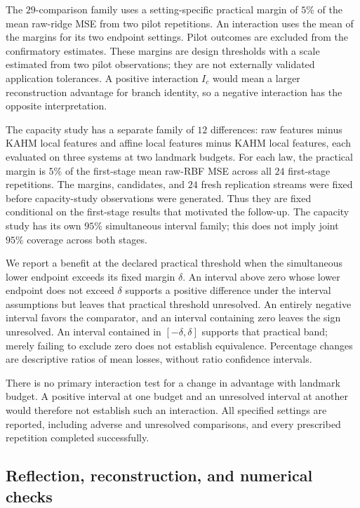 The $29$-comparison family uses a setting-specific practical margin
of $5\%$ of the mean raw-ridge MSE from two pilot repetitions.
An interaction uses the mean of the margins for its two endpoint
settings. Pilot outcomes are excluded from the confirmatory estimates.
These margins are design thresholds with a scale estimated from two
pilot observations; they are not externally validated application
tolerances. A positive interaction $I_c$ would mean a larger
reconstruction advantage for branch identity, so a negative interaction
has the opposite interpretation.

The capacity study has a separate family of $12$ differences: raw
features minus KAHM local features and affine local features minus KAHM
local features, each evaluated on three systems at two landmark budgets.
For each law, the practical margin is $5\%$ of the first-stage mean
raw-RBF MSE across all $24$ first-stage repetitions. The margins,
candidates, and $24$ fresh replication streams were fixed before
capacity-study observations were generated. Thus they are fixed
conditional on the first-stage results that motivated the follow-up.
The capacity study has its own $95\%$ simultaneous interval family;
this does not imply joint $95\%$ coverage across both stages.

We report a benefit at the declared practical threshold when the
simultaneous lower endpoint exceeds its fixed margin $\delta$.
An interval above zero whose lower endpoint does not exceed $\delta$
supports a positive difference under the interval assumptions but
leaves that practical threshold unresolved. An entirely negative
interval favors the comparator, and an interval containing zero
leaves the sign unresolved. An interval contained in
$[-\delta,\delta]$ supports that practical band; merely failing to
exclude zero does not establish equivalence. Percentage changes are
descriptive ratios of mean losses, without ratio confidence intervals.

There is no primary interaction test for a change in advantage with
landmark budget. A positive interval at one budget and an unresolved
interval at another would therefore not establish such an interaction.
All specified settings are reported, including adverse and unresolved
comparisons, and every prescribed repetition completed successfully.

\subsection{Reflection, reconstruction, and numerical checks}

